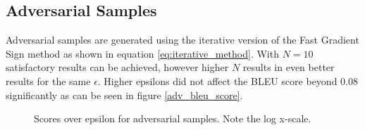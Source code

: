 \subsection*{Adversarial Samples}
Adversarial samples are generated using the iterative version of the Fast Gradient Sign method as shown in equation \ref{eq:iterative_method}. With $N=10$ satisfactory results can be achieved, however higher $N$ results in even better results for the same $\epsilon$. Higher epsilons did not affect the BLEU score beyond $0.08$ significantly as can be seen in figure \ref{adv_bleu_score}.

\begin{figure}[h]
    \centering
    \vspace{\floatsep}
    \caption{Scores over epsilon for adversarial samples. Note the log x-scale.}
\end{figure}

